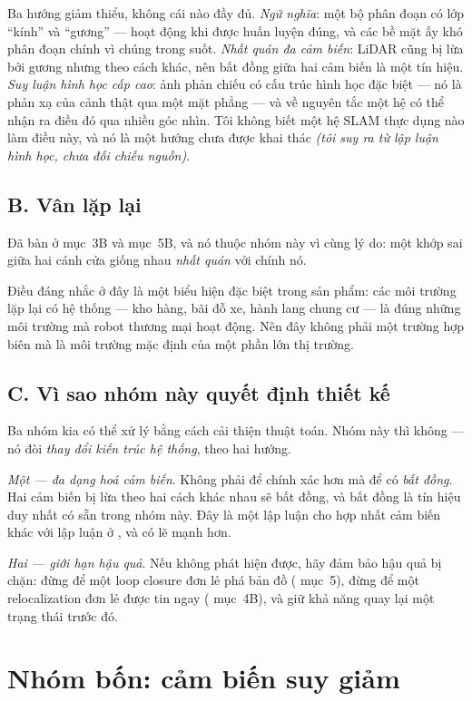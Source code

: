\documentclass[../../vslam.tex]{subfiles}
\begin{document}
Ba hướng giảm thiểu, không cái nào đầy đủ. \emph{Ngữ nghĩa}: một bộ phân đoạn có lớp ``kính'' và ``gương'' --- hoạt động khi được huấn luyện đúng, và các bề mặt ấy khó phân đoạn chính vì chúng trong suốt. \emph{Nhất quán đa cảm biến}: LiDAR cũng bị lừa bởi gương nhưng theo cách khác, nên bất đồng giữa hai cảm biến là một tín hiệu. \emph{Suy luận hình học cấp cao}: ảnh phản chiếu có cấu trúc hình học đặc biệt --- nó là phản xạ của cảnh thật qua một mặt phẳng --- và về nguyên tắc một hệ có thể nhận ra điều đó qua nhiều góc nhìn. Tôi không biết một hệ SLAM thực dụng nào làm điều này, và nó là một hướng chưa được khai thác \emph{(tôi suy ra từ lập luận hình học, chưa đối chiếu nguồn)}.

\subsection{B. Vân lặp lại}

Đã bàn ở  mục~3B và  mục~5B, và nó thuộc nhóm này vì cùng lý do: một khớp sai giữa hai cánh cửa giống nhau \emph{nhất quán} với chính nó.

Điều đáng nhắc ở đây là một biểu hiện đặc biệt trong sản phẩm: các môi trường lặp lại có hệ thống --- kho hàng, bãi đỗ xe, hành lang chung cư --- là đúng những môi trường mà robot thương mại hoạt động. Nên đây không phải một trường hợp biên mà là môi trường mặc định của một phần lớn thị trường.

\subsection{C. Vì sao nhóm này quyết định thiết kế}

Ba nhóm kia có thể xử lý bằng cách cải thiện thuật toán. Nhóm này thì không --- nó đòi \emph{thay đổi kiến trúc hệ thống}, theo hai hướng.

\emph{Một --- đa dạng hoá cảm biến}. Không phải để chính xác hơn mà để có \emph{bất đồng}. Hai cảm biến bị lừa theo hai cách khác nhau sẽ bất đồng, và bất đồng là tín hiệu duy nhất có sẵn trong nhóm này. Đây là một lập luận cho hợp nhất cảm biến khác với lập luận ở , và có lẽ mạnh hơn.

\emph{Hai --- giới hạn hậu quả}. Nếu không phát hiện được, hãy đảm bảo hậu quả bị chặn: đừng để một loop closure đơn lẻ phá bản đồ ( mục~5), đừng để một relocalization đơn lẻ được tin ngay ( mục~4B), và giữ khả năng quay lại một trạng thái trước đó.

\section{Nhóm bốn: cảm biến suy giảm}
\end{document}
